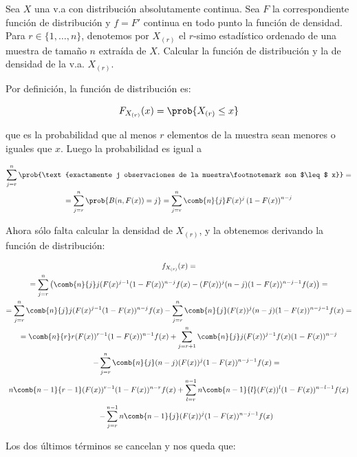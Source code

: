 \begin{problem}[7] Sea $X$ una v.a con distribución absolutamente continua. Sea $F$ la correspondiente función de distribución y $f = F'$ continua en todo punto la función de densidad. Para $r\in \{1,\dotsc,n\}$, denotemos por $X_{(r)}$ el $r$-simo estadístico ordenado de una muestra de tamaño $n$ extraída de $X$. Calcular la función de distribución y la de densidad de la v.a. $X_{(r)}$.

\solution

Por definición, la función de distribución es:

\[ F_{X_{(r)}} (x) = \prob{X_{(r)} \leq x }\]

que es la probabilidad que al menos $r$ elementos de la muestra sean menores o iguales que $x$. Luego la probabilidad es igual a

\begin{gather*}
\sum_{j=r}^n \prob{\text{exactamente j observaciones de la muestra\footnotemark son $\leq$ x}} =  \\
= \sum_{j=r}^n \prob{B(n, F(x)) = j} = \sum_{j=r}^n \comb{n}{j}F(x)^j \left(1 - F(x)\right)^{n-j}
\end{gather*}

Ahora sólo falta calcular la densidad de $X_{(r)}$, y la obtenemos derivando la función de distribución:

\newpage
\begin{gather*}
 f_{X_{(r)}} (x) = \\
 = \sum_{j=r}^n \left(\comb{n}{j}j(F(x)^{j-1}(1-F(x))^{n-j}f(x) - (F(x))^j(n-j)(1-F(x))^{n-j-1} f(x)\right) = \\
 = \sum_{j=r}^n \comb{n}{j} j(F(x)^{j-1}(1-F(x))^{n-j}f(x)  - \sum_{j=r}^n\comb{n}{j} (F(x))^j(n-j)(1-F(x))^{n-j-1} f(x) = \\
 = \comb{n}{r} r(F(x))^{r-1} (1-F(x))^{n-1}f(x) + \sum_{j=r+1}^n \comb{n}{j}j(F(x))^{j-1} f(x) (1-F(x))^{n-j} \\
 \quad \quad - \sum_{j=r}^n\comb{n}{j}(n-j)(F(x))^j (1-F(x))^{n-j-1}f(x) = \\
 n\comb{n-1}{r-1}(F(x))^{r-1} (1-F(x))^{n-r} f(x) + \sum_{l=r}^{n-1}n\comb{n-1}{l}(F(x))^l (1-F(x))^{n-l-1} f(x) \\
 \quad\quad -  \sum_{j=r}^{n-1}n\comb{n-1}{j}(F(x))^j (1-F(x))^{n-j-1} f(x)
\end{gather*} 

Los dos últimos términos se cancelan y nos queda que:


\end{problem}
